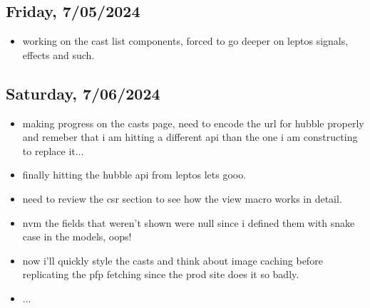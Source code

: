 \subsection*{Friday, 7/05/2024}
\begin{itemize}
    \item working on the cast list components, forced to go deeper on leptos
        signals, effects and such.
\end{itemize}

\subsection*{Saturday, 7/06/2024}
\begin{itemize}
    \item making progress on the casts page, need to encode the url for hubble
        properly and remeber that i am hitting a different api than the one i am
        constructing to replace it...
    \item finally hitting the hubble api from leptos lets gooo.
    \item need to review the csr section to see how the view macro works in
        detail.
    \item nvm the fields that weren't shown were null since i defined them with
        snake case in the models, oops!
    \item now i'll quickly style the casts and think about image caching before
        replicating the pfp fetching since the prod site does it so badly.
    \item ...
\end{itemize}
